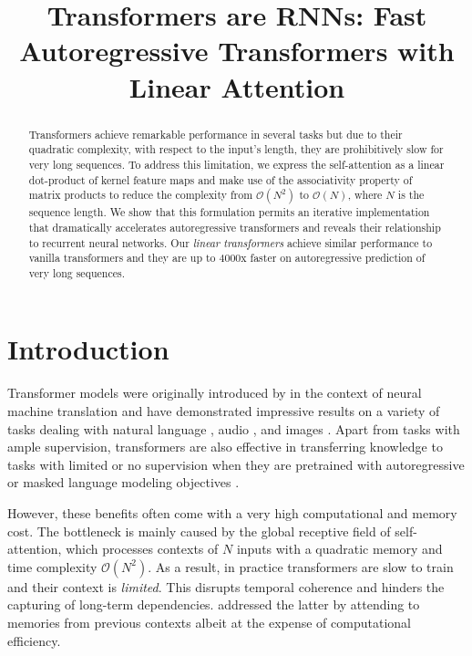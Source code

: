 \title{Transformers are RNNs: Fast Autoregressive Transformers with Linear Attention}

\begin{abstract}
Transformers achieve remarkable performance in several tasks but due to their quadratic complexity, with respect to the input's length, they are prohibitively slow for very long sequences. To address this limitation, we express the self-attention as a linear dot-product of kernel feature maps and make use of the associativity property of matrix products to reduce the complexity from $\mathcal{O}\left(N^2\right)$ to $\mathcal{O}\left(N\right)$, where $N$ is the sequence length. We show that this formulation permits an iterative implementation that dramatically accelerates autoregressive transformers and reveals their relationship to recurrent neural networks. Our \textit{linear transformers} achieve similar performance to vanilla transformers and they are up to 4000x faster on autoregressive prediction of very long sequences.
\end{abstract}

\section{Introduction}

Transformer models were originally introduced by \citet{vaswani_attn} in the context of neural machine translation \cite{Sutskever14,bahdanau14} and have demonstrated impressive results on a variety of tasks dealing with natural language \cite{devlin-etal-2019}, audio \cite{sperber18interspeech}, and images \cite{parmar-etal-19}. Apart from tasks with ample supervision, transformers are also effective in transferring knowledge to tasks with limited or no supervision when they are pretrained with autoregressive \cite{Radford2018ImprovingLU,radford2019language} or masked language modeling objectives \cite{devlin-etal-2019,zhilin19,pmlr-v97-song19d,liu2020roberta}.

However, these benefits often come with a very high computational and memory cost. The bottleneck is mainly caused by the global receptive field of self-attention, which processes contexts of $N$ inputs with a quadratic memory and time complexity
$\mathcal{O}\left(N^2\right)$. As a result, in practice transformers are slow to train and their context is \textit{limited}. This disrupts temporal coherence and hinders the capturing of long-term dependencies. \citet{dai-etal-2019-transformer}
addressed the latter by attending to memories from previous contexts albeit at the expense of computational efficiency.

